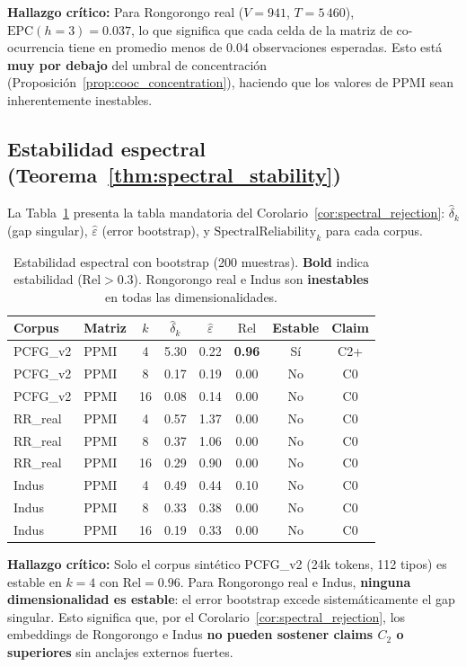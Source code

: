 \documentclass[11pt,a4paper]{article}
\newcommand{\1}{\mathbf{1}}
\numberwithin{equation}{section}
\begin{document}
\textbf{Hallazgo crítico:} Para Rongorongo real ($V=941$, $T=5\,460$), $\mathrm{EPC}(h=3) = 0.037$, lo que significa que cada celda de la matriz de co-ocurrencia tiene en promedio menos de 0.04 observaciones esperadas. Esto está \textbf{muy por debajo} del umbral de concentración (Proposición~\ref{prop:cooc_concentration}), haciendo que los valores de PPMI sean inherentemente inestables.

\subsection{Estabilidad espectral (Teorema~\ref{thm:spectral_stability})}

La Tabla~\ref{tab:reliability} presenta la tabla mandatoria del Corolario~\ref{cor:spectral_rejection}: $\widehat\delta_k$ (gap singular), $\widehat\varepsilon$ (error bootstrap), y $\mathrm{SpectralReliability}_k$ para cada corpus.

\begin{table}[h]
\centering
\caption{Estabilidad espectral con bootstrap (200 muestras). \textbf{Bold} indica estabilidad ($\mathrm{Rel} > 0.3$). Rongorongo real e Indus son \textbf{inestables} en todas las dimensionalidades.}
\label{tab:reliability}
\begin{tabular}{llcccccc}
\toprule
Corpus & Matriz & $k$ & $\widehat\delta_k$ & $\widehat\varepsilon$ & $\mathrm{Rel}$ & Estable & Claim \\
\midrule
PCFG\_v2 & PPMI & 4 & 5.30 & 0.22 & \textbf{0.96} & Sí & C2+ \\
PCFG\_v2 & PPMI & 8 & 0.17 & 0.19 & 0.00 & No & C0 \\
PCFG\_v2 & PPMI & 16 & 0.08 & 0.14 & 0.00 & No & C0 \\
RR\_real & PPMI & 4 & 0.57 & 1.37 & 0.00 & No & C0 \\
RR\_real & PPMI & 8 & 0.37 & 1.06 & 0.00 & No & C0 \\
RR\_real & PPMI & 16 & 0.29 & 0.90 & 0.00 & No & C0 \\
Indus & PPMI & 4 & 0.49 & 0.44 & 0.10 & No & C0 \\
Indus & PPMI & 8 & 0.33 & 0.38 & 0.00 & No & C0 \\
Indus & PPMI & 16 & 0.19 & 0.33 & 0.00 & No & C0 \\
\bottomrule
\end{tabular}
\end{table}

\textbf{Hallazgo crítico:} Solo el corpus sintético PCFG\_v2 (24k tokens, 112 tipos) es estable en $k=4$ con $\mathrm{Rel}=0.96$. Para Rongorongo real e Indus, \textbf{ninguna dimensionalidad es estable}: el error bootstrap excede sistemáticamente el gap singular. Esto significa que, por el Corolario~\ref{cor:spectral_rejection}, los embeddings de Rongorongo e Indus \textbf{no pueden sostener claims $C_2$ o superiores} sin anclajes externos fuertes.
\end{document}
